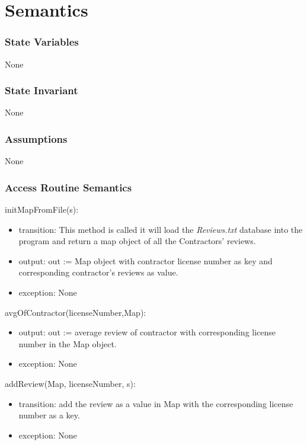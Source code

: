 \documentclass[12pt]{scrartcl}
\begin{document}
\section {Semantics}


\subsubsection {State Variables}

None

\subsubsection {State Invariant}

None

\subsubsection {Assumptions}

None

\subsubsection {Access Routine Semantics}

initMapFromFile(s):
\begin{itemize}
\item transition:  This method is called it will load the \textit{Reviews.txt} database into the program and return a map object of all the Contractors' reviews.
\item output: out := Map object with contractor license number as key and corresponding contractor's reviews as value.
\item exception: None
\end{itemize}


avgOfContractor(licenseNumber,Map):
\begin{itemize}
\item output: out := average review of contractor with corresponding license number in the Map object.
\item exception: None
\end{itemize}

addReview(Map, licenseNumber, s):
\begin{itemize}
\item transition: add the review as a value in Map with the corresponding license number as a key.
\item exception: None
\end{itemize}
\end{document}
